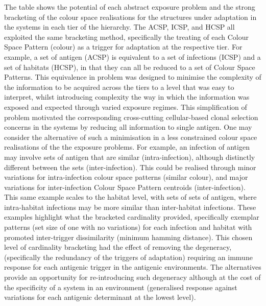 The table shows the potential of each abstract exposure problem and the strong bracketing of the colour space realisations for the structures under adaptation in the systems in each tier of the hierarchy. 
The ACSP, ICSP, and HCSP all exploited the same bracketing method, specifically the treating of each Colour Space Pattern (colour) as a trigger for adaptation at the respective tier. For example, a set of antigen (ACSP) is equivalent to a set of infections (ICSP) and a set of habitats (HCSP), in that they can all be reduced to a set of Colour Space Patterns.
This equivalence in problem was designed to minimise the complexity of the information to be acquired across the tiers to a level that was easy to interpret, whilst introducing complexity the way in which the information was exposed and expected through varied exposure regimes.
This simplification of problem motivated the corresponding cross-cutting cellular-based clonal selection concerns in the systems by reducing all information to single antigen. One may consider the alternative of such a minimisation in a less constrained colour space realisations of the the exposure problems. For example, an infection of antigen may involve sets of antigen that are similar (intra-infection), although distinctly different between the sets (inter-infection). This could be realised through minor variations for intra-infection colour space patterns (similar colour), and major variations for inter-infection Colour Space Pattern centroids (inter-infection). This same example scales to the habitat level, with sets of sets of antigen, where intra-habitat infections may be more similar than inter-habitat infections. 
These examples highlight what the bracketed cardinality provided, specifically exemplar patterns (set size of one with no variations) for each infection and habitat with promoted inter-trigger dissimilarity (minimum hamming distance).
This chosen level of cardinality bracketing had the effect of removing the degeneracy, (specifically the redundancy of the triggers of adaptation) requiring an immune response for each antigenic trigger in the antigenic environments. The alternatives provide an opportunity for re-introducing such degeneracy although at the cost of the specificity of a system in an environment (generalised response against variations for each antigenic determinant at the lowest level).

%
%

